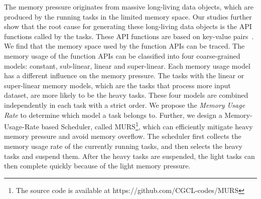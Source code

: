 The memory pressure originates from massive long-living data objects, which are produced by the running tasks in the limited memory space. Our studies further show that the root cause for generating these long-living data objects is the API functions called by the tasks. These API functions are based on key-value pairs~\cite{dean2008mapreduce, zaharia2012resilient, hueske2012opening, isard2007dryad}. We find that the memory space used by the function APIs can be traced. The memory usage of the function APIs can be classified into four coarse-grained models: constant, sub-linear, linear and super-linear. Each memory usage model has a different influence on the memory pressure. The tasks with the linear or super-linear memory models, which are the tasks that process more input dataset, are more likely to be the heavy tasks. These four models are combined independently in each task with a strict order. We propose the \textit{Memory Usage Rate} to determine which model a task belongs to. Further, we design a Memory-Usage-Rate based Scheduler, called MURS\footnote{The source code is available at https://github.com/CGCL-codes/MURS}, which can efficiently mitigate heavy memory pressure and avoid memory overflow. The scheduler first collects the memory usage rate of the currently running tasks, and then selects the heavy tasks and suspend them. After the heavy tasks are suspended, the light tasks can then complete quickly because of the light memory pressure.


